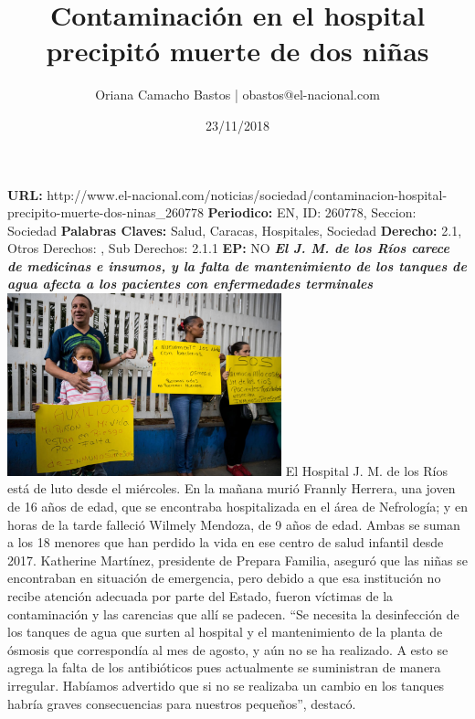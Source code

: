 \documentclass{article}%
\title{\textbf{Contaminación en el hospital precipitó muerte de dos niñas}}%
\author{Oriana Camacho Bastos | obastos@el{-}nacional.com}%
\date{23/11/2018}%
\begin{document}
%
\normalsize%
\maketitle%
\textbf{URL: }%
http://www.el{-}nacional.com/noticias/sociedad/contaminacion{-}hospital{-}precipito{-}muerte{-}dos{-}ninas\_260778\newline%
%
\textbf{Periodico: }%
EN, %
ID: %
260778, %
Seccion: %
Sociedad\newline%
%
\textbf{Palabras Claves: }%
Salud, Caracas, Hospitales, Sociedad\newline%
%
\textbf{Derecho: }%
2.1, %
Otros Derechos: %
, %
Sub Derechos: %
2.1.1\newline%
%
\textbf{EP: }%
NO\newline%
\newline%
%
\textbf{\textit{El J. M. de los Ríos carece de medicinas e insumos, y la falta de mantenimiento de los tanques de agua afecta a los pacientes con enfermedades terminales}}%
\newline%
\newline%
%
\includegraphics[width=300px]{133.jpg}%
\newline%
%
El Hospital J. M. de los Ríos está de luto desde el miércoles. En la mañana murió Frannly Herrera, una joven de 16 años de edad, que se encontraba hospitalizada en el área de Nefrología; y en horas de la tarde falleció Wilmely Mendoza, de 9 años de edad. Ambas se suman a los 18 menores que han perdido la vida en ese centro de salud infantil desde 2017. Katherine Martínez, presidente de Prepara Familia, aseguró que las niñas se encontraban en situación de emergencia, pero debido a que esa institución no recibe atención adecuada por parte del Estado, fueron víctimas de la contaminación y las carencias que allí se padecen.%
\newline%
%
“Se necesita la desinfección de los tanques de agua que surten al hospital y el mantenimiento de la planta de ósmosis que correspondía al mes de agosto, y aún no se ha realizado. A esto se agrega la falta de los antibióticos pues actualmente se suministran de manera irregular. Habíamos advertido que si no se realizaba un cambio en los tanques habría graves consecuencias para nuestros pequeños”, destacó.%
\end{document}
